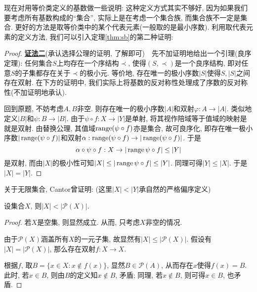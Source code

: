 现在对用等价类定义的基数做一些说明: 这种定义方式其实不够好, 因为如果我们要考虑所有基数构成的“集合”, 实际上是在考虑一个集合族, 而集合族不一定是集合. 更好的方法是取等价类中的某个代表元素(一般取的是最小序数). 利用取代表元素的定义方法, 我们可以引入定理\ref{thm:sb}的第二种证明: 

\begin{proof}
	\underline{\textbf{证法二}}(承认选择公理的证明, 了解即可)~~先不加证明地给出一个引理(良序定理): 任何集合$S$上均存在一个序结构$\prec$, 使得$(S,\prec)$是一个良序结构, 即对任意$S$的子集都存在关于$\prec$的极小元. 等价地, 存在唯一的极小序数$|S|$使得$S,|S|$之间存在双射. 在下方的证明中, 我们实际上将基数的反对称性处理成了序数的反对称性(不加证明地承认). 
	
	回到原题, 不妨考虑$A,B$非空. 则存在唯一的极小序数$|A|$和双射$\varphi :A \to |A|$. 类似地定义$|B|$和$\psi :B \to |B|$. 由于$\psi \circ f:X \to |Y|$是单射, 将其视作陪域等于值域的映射是就是双射. 由替换公理, 其值域$\operatorname{range} (\psi \circ f)$亦是集合, 故可良序化, 即存在唯一极小序数$|\operatorname{range} (\psi \circ f)|$和双射$\alpha :\operatorname{range} (\psi \circ f) \to |\operatorname{range} (\psi \circ f)|$. 于是$$\alpha \circ \psi \circ f:X \to |\operatorname{range} \psi \circ f| \leq |Y|$$
	是双射, 而由$|X|$的极小性可知$|X| \leq |\operatorname{range} \psi \circ f| \leq |Y|$. 同理可得$|Y| \leq |X|$. 于是$|X|=|Y|$. 
\end{proof}



关于无限集合, Cantor曾证明: (这里$|X|<|Y|$承自然的严格偏序定义)

\begin{theorem}{}
	设集合$X$, 则$|X|< |\mathcal{P}(X)|$.
\end{theorem}
\begin{proof}
	若$X$是空集, 则显然成立. 从而, 只考虑$X$非空的情况. 
	
	由于$\mathcal{P}(X)$涵盖所有$X$的一元子集, 故显然有$|X| \leq |\mathcal{P}(X)|$. 假设有$|X| = | \mathcal{P}(X)|$, 那么存在双射$f: X \to X$. 
	
	根据$f$, 取$B=\{ x \in X: x \notin f(x) \}$, 显然$B \in \mathcal{P}(A)$, 从而存在$x$使得$f(x)=B$. 此时, 若$x \in B$, 则由$B$的定义知$x \notin B$, 矛盾; 同理, 若$x \notin B$, 则可得$x \in B$, 也矛盾. 
\end{proof}


